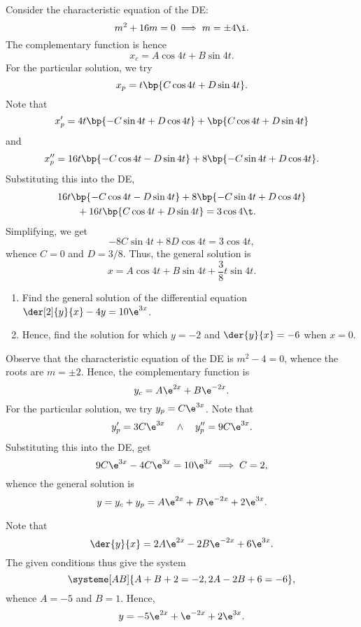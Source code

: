 \begin{solution}
\begin{ppart}
    \end{ppart}
    \begin{ppart}
        Consider the characteristic equation of the DE: \[m^2 + 16m = 0 \implies m = \pm 4 \i.\] The complementary function is hence \[x_c = A\cos 4t + B \sin 4t.\] For the particular solution, we try \[x_p = t\bp{C\cos 4t + D \sin 4t}.\] Note that \[x_p' = 4t\bp{-C\sin 4t + D\cos 4t} + \bp{C \cos 4t + D \sin 4t}\] and \[x_p'' = 16t\bp{-C\cos 4t - D\sin 4t} + 8\bp{-C\sin 4t + D \cos 4t}.\] Substituting this into the DE, 
        \begin{align*}
            &16t\bp{-C\cos 4t - D\sin 4t} + 8\bp{-C\sin 4t + D \cos 4t}\\
            &\hspace{2em}+ 16t\bp{C\cos 4t + D \sin 4t} = 3\cos 4\t.
        \end{align*}
        Simplifying, we get \[-8C \sin 4t + 8D \cos 4t = 3\cos 4t,\] whence $C = 0$ and $D = 3/8$. Thus, the general solution is \[x = A\cos4t + B \sin 4t + \frac38 t\sin 4t.\]
    \end{ppart}
\end{solution}

\begin{problem}
    \begin{enumerate}
        \item Find the general solution of the differential equation $\der[2]{y}{x} - 4y = 10 \e^{3x}$.
        \item Hence, find the solution for which $y = -2$ and $\der{y}{x} = -6$ when $x = 0$.
    \end{enumerate}
\end{problem}
\begin{solution}
    \begin{ppart}
        Observe that the characteristic equation of the DE is $m^2 -4 = 0$, whence the roots are $m = \pm 2$. Hence, the complementary function is \[y_c = A\e^{2x} + B\e^{-2x}.\] For the particular solution, we try $y_p = C\e^{3x}$. Note that \[y_p' = 3C\e^{3x} \quad \land \quad y_p'' = 9C\e^{3x}.\] Substituting this into the DE, get \[9C\e^{3x} - 4C\e^{3x} = 10\e^{3x} \implies C = 2,\] whence the general solution is \[y = y_c + y_p = A\e^{2x} + B\e^{-2x} + 2\e^{3x}.\]
    \end{ppart}
    \begin{ppart}
        Note that \[\der{y}{x} = 2A\e^{2x} - 2B\e^{-2x} + 6\e^{3x}.\] The given conditions thus give the system \[\systeme[AB]{A + B + 2= -2, 2A - 2B + 6 = -6},\] whence $A = -5$ and $B = 1$. Hence, \[y = -5\e^{2x} + \e^{-2x} + 2\e^{3x}.\]
    \end{ppart}
\end{solution}

